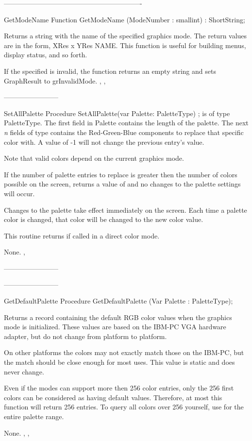-------------------------------------------------------------
\begin{function}{GetModeName}
\Declaration
Function GetModeName (ModeNumber : smallint) : ShortString;

\Description

Returns a string with the name of the specified graphics mode. The
return values are in the form, XRes x YRes NAME. This function is
useful for building menus, display status, and so forth.

\Errors
If the specified  is invalid, the function returns an
empty string and sets GraphResult to grInvalidMode.
\SeeAlso
{}, , 
\end{function}
------------------------
\begin{procedure}{SetAllPalette}
\Declaration
Procedure SetAllPalette(var Palette: PaletteType) ;
\Description
{} is of type PaletteType. The first field in Palette
contains the length of the palette. The next \textit{n} fields of
type  contains the Red-Green-Blue components to replace
that specific color with. A value of -1 will not change the previous
entry's value.

Note that valid colors depend on the current graphics mode.

If the number of palette entries to replace is greater then the
number of colors possible on the screen,  returns
a value of  and no changes to the palette settings will
occur.

Changes to the palette take effect immediately on the screen. Each time
a palette color is changed, that color will be changed to the new color
value.

This routine returns  if called in a direct color mode.

\Errors
None.
\SeeAlso
{}, 
\end{procedure}
------------------------

------------------------
\begin{procedure}{GetDefaultPalette}
\Declaration
Procedure GetDefaultPalette (Var Palette : PaletteType);

\Description
Returns a  record containing the default RGB color
values when the graphics mode is initialized. These values are based
on the IBM-PC VGA hardware adapter, but do not change from platform
to platform.

On other platforms the colors may not exactly match those
on the IBM-PC, but the match should be close enough for most uses. This
value is static and does never change.

Even if the modes can support more then 256 color entries, only the
256 first colors can be considered as having default values. Therefore,
at most this function will return 256 entries. To query all colors over
256 yourself, use  for the entire palette range.

\Errors
None.
\SeeAlso
{}, , 
\end{procedure}


